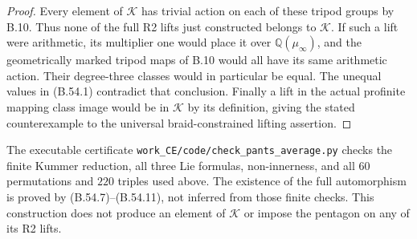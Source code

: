 \begin{proof}
Every element of $\mathcal K$ has trivial action on
each of these tripod groups by B.10. Thus none of the
full R2 lifts just constructed belongs to $\mathcal K$.
If such a lift were arithmetic, its multiplier one
would place it over $\mathbb Q(\mu_\infty)$, and the
geometrically marked tripod maps of B.10 would all
have its same arithmetic action. Their degree-three
classes would in particular be equal. The unequal
values in (B.54.1) contradict that conclusion.
Finally a lift in the actual profinite mapping class
image would be in $\mathcal K$ by its definition,
giving the stated counterexample to the universal
braid-constrained lifting assertion.
\end{proof}

The executable certificate
\texttt{work\_CE/code/check\_pants\_average.py}
checks the finite Kummer reduction, all three Lie
formulas, non-innerness, and all $60$ permutations and
$220$ triples used above. The existence of the full
automorphism is proved by (B.54.7)--(B.54.11), not
inferred from those finite checks. This construction
does not produce an element of $\mathcal K$ or impose
the pentagon on any of its R2 lifts.

